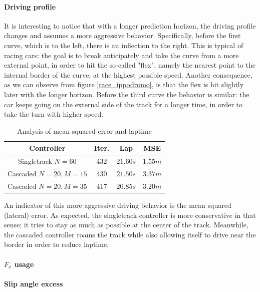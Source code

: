 \documentclass[a4paper, onecolumn, 12pt]{article}
\begin{document}
\paragraph{Driving profile}
It is interesting to notice that with a longer prediction horizon, the driving
profile changes and assumes a more aggressive behavior. Specifically, before the
first curve, which is to the left, there is an inflection to the right. This is
typical of racing cars: the goal is to break anticipately and take the curve
from a more external point, in order to hit the so-called "flex", namely the
nearest point to the internal border of the curve, at the highest possible
speed. Another consequence, as we can observe from figure \ref{race_ippodromo},
is that the flex is hit slightly later with the longer horizon. Before the third
curve the behavior is similar: the car keeps going on the external side of the
track for a longer time, in order to take the turn with higher speed.
\begin{table}[H]
    \centering
    \caption{Analysis of mean squared error and laptime}
    \begin{tabular}{|c||c|c|c|}
        \hline
        \textbf{Controller} & \textbf{Iter.} & \textbf{Lap} & \textbf{MSE} \\ [0.5ex] 
        \hline
        \hline
        Singletrack $N=60$ & 432 & $21.60 s$ & $1.55 m$ \\
        \hline
        Cascaded $N=20, M=15$ & 430 & $21.50 s$ & $3.37 m$ \\
        \hline
        Cascaded $N=20, M=35$ & 417 & $20.85 s$ & $3.20 m$ \\
        \hline
    \end{tabular}
\end{table}
An indicator of this more aggressive driving behavior is the mean squared
(lateral) error. As expected, the singletrack controller is more conservative in
that sense; it tries to stay as much as possible at the center of the track.
Meanwhile, the cascaded controller roams the track while also allowing itself to
drive near the border in order to reduce laptime.

\paragraph{$F_x$ usage}

\paragraph{Slip angle excess}
\end{document}
